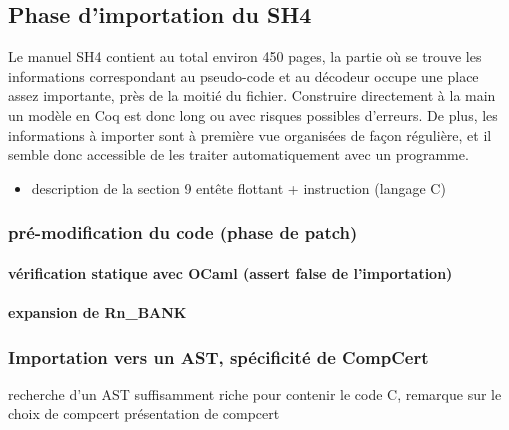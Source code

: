 \documentclass[a4paper, 11pt]{article}
\begin{document}
  \subsection{Phase d'importation du SH4}
Le manuel SH4 contient au total environ 450 pages, la partie où se trouve les informations correspondant au pseudo-code et au décodeur occupe une place assez importante, près de la moitié du fichier. Construire directement à la main un modèle en Coq est donc long ou avec risques possibles d'erreurs. De plus, les informations à importer sont à première vue organisées de façon régulière, et il semble donc accessible de les traiter automatiquement avec un programme.

    \begin{itemize}
    \item description de la section 9
 entête flottant + instruction (langage C)
    \end{itemize}


    \subsubsection{pré-modification du code (phase de patch)}
      \paragraph{vérification statique avec OCaml (assert false de l'importation)}
      \paragraph{expansion de Rn\_BANK}

    \subsubsection{Importation vers un AST, spécificité de CompCert}
recherche d'un AST suffisamment riche pour contenir le code C, remarque sur le choix de compcert
présentation de compcert
\end{document}
